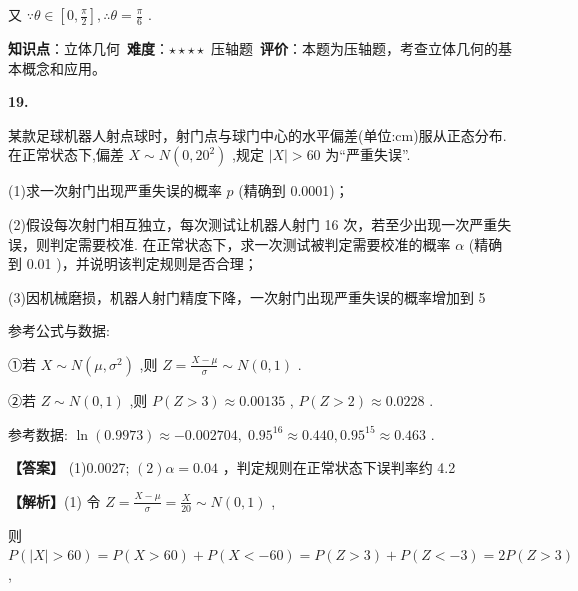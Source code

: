 \documentclass[10pt]{article}
\newenvironment{questionblock}[1]{%
  \needspace{3\baselineskip}%
  \noindent\textbf{#1.}%
}{%
  \par\vspace{1em}%
}
\begin{document}
又 \(\because \theta  \in  \left\lbrack  {0,\frac{\pi }{2}}\right\rbrack  ,\therefore \theta  = \frac{\pi }{6}\) .

\begin{analysisbox}[考点分析]
\textbf{知识点}：立体几何\
\textbf{难度}：$\star\star\star\star$ 压轴题\
\textbf{评价}：本题为压轴题，考查立体几何的基本概念和应用。
\end{analysisbox}

\begin{questionblock}{19}
某款足球机器人射点球时，射门点与球门中心的水平偏差(单位:cm)服从正态分布. 在正常状态下,偏差 \(X \sim  N\left( {0,{20}^{2}}\right)\) ,规定 \(\left| X\right|  > {60}\) 为“严重失误”.

(1)求一次射门出现严重失误的概率 \(p\) (精确到 0.0001)；

(2)假设每次射门相互独立，每次测试让机器人射门 16 次，若至少出现一次严重失误，则判定需要校准. 在正常状态下，求一次测试被判定需要校准的概率 \(\alpha\) (精确到 0.01 )，并说明该判定规则是否合理；

(3)因机械磨损，机器人射门精度下降，一次射门出现严重失误的概率增加到 5%

参考公式与数据:

①若 \(X \sim  N\left( {\mu ,{\sigma }^{2}}\right)\) ,则 \(Z = \frac{X - \mu }{\sigma } \sim  N\left( {0,1}\right)\) .

②若 \(Z \sim  N\left( {0,1}\right)\) ,则 \(P\left( {Z > 3}\right)  \approx  {0.00135}\) , \(P\left( {Z > 2}\right)  \approx  {0.0228}\) .

参考数据: \(\ln \left( {0.9973}\right)  \approx   - {0.002704},\;{0.95}^{16} \approx  {0.440},{0.95}^{15} \approx  {0.463}\) .
\end{questionblock}

\textbf{【答案】} (1)0.0027; \(\left( 2\right) \alpha  = {0.04}\) ，判定规则在正常状态下误判率约 4.2%

\textbf{【解析】}(1) 令 \(Z = \frac{X - \mu }{\sigma } = \frac{X}{20} \sim  N\left( {0,1}\right)\) ,

则 \(P\left( {\left| X\right|  > {60}}\right)  = P\left( {X > {60}}\right)  + P\left( {X <  - {60}}\right)  = P\left( {Z > 3}\right)  + P\left( {Z <  - 3}\right)  = {2P}\left( {Z > 3}\right)\) ,
\end{document}
